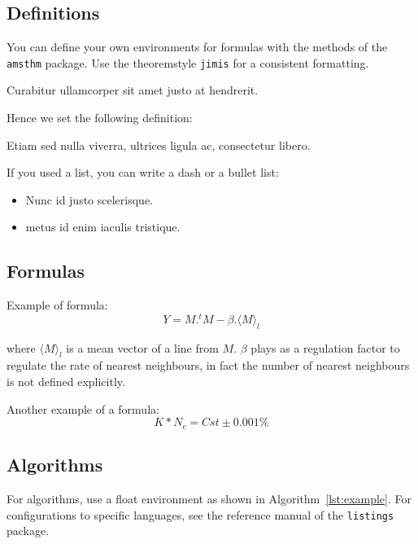 \documentclass{jimis}
\begin{document}
\subsection{Definitions}
You can define your own environments for formulas with the methods of the \texttt{amsthm} package. Use the theoremstyle \texttt{jimis} for a consistent formatting.

\begin{definition}[alpha]
Curabitur ullamcorper sit amet justo at hendrerit.
\end{definition}

Hence we set the following definition:

\begin{definition}[beta]
Etiam sed nulla viverra, ultrices ligula ac, consectetur libero.
\end{definition}

If you used a list, you can write a dash or a bullet list:
\begin{itemize}
  \item Nunc id justo scelerisque.
  \item metus id enim iaculis tristique.
\end{itemize}

\subsection{Formulas}

Example of formula:
\begin{equation}
  Y=M.^tM-\beta.\langle M \rangle_l
\end{equation}

where $\langle M \rangle_l$ is a mean vector of a line from $M$. $\beta$ plays as a regulation factor to regulate the
rate of nearest neighbours, in fact the number of nearest neighbours is not defined explicitly.

Another example of a formula:
\begin{equation}
  K * N_c = Cst \pm 0.001\%
\end{equation}

\subsection{Algorithms}

For algorithms, use a float environment as shown in Algorithm~\ref{lst:example}. For configurations to specific languages, see the reference manual of the \texttt{listings} package.
\end{document}
